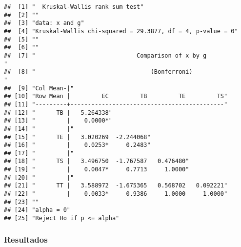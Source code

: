 \documentclass[]{article}
\begin{document}
\begin{verbatim}
##  [1] "  Kruskal-Wallis rank sum test"                                                 
##  [2] ""                                                                               
##  [3] "data: x and g"                                                                  
##  [4] "Kruskal-Wallis chi-squared = 29.3877, df = 4, p-value = 0"                      
##  [5] ""                                                                               
##  [6] ""                                                                               
##  [7] "                             Comparison of x by g                              "
##  [8] "                                 (Bonferroni)                                  "
##  [9] "Col Mean-|"                                                                     
## [10] "Row Mean |         EC         TB         TE         TS"                         
## [11] "---------+--------------------------------------------"                         
## [12] "      TB |   5.264338"                                                          
## [13] "         |    0.0000*"                                                          
## [14] "         |"                                                                     
## [15] "      TE |   3.020269  -2.244068"                                               
## [16] "         |    0.0253*     0.2483"                                               
## [17] "         |"                                                                     
## [18] "      TS |   3.496750  -1.767587   0.476480"                                    
## [19] "         |    0.0047*     0.7713     1.0000"                                    
## [20] "         |"                                                                     
## [21] "      TT |   3.588972  -1.675365   0.568702   0.092221"                         
## [22] "         |    0.0033*     0.9386     1.0000     1.0000"                         
## [23] ""                                                                               
## [24] "alpha = 0"                                                                      
## [25] "Reject Ho if p <= alpha"
\end{verbatim}

\hypertarget{resultados}{%
\subsubsection{Resultados}\label{resultados}}
\end{document}

